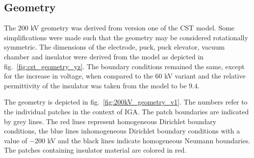 \subsection{Geometry}
The $200$ kV geometry was derived from version one of the CST model. Some simplifications were made such that the geometry may be considered rotationally symmetric. The dimensions of the electrode, puck, puck elevator, vacuum chamber and insulator were derived from the model as depicted in fig.~\ref{fig:cst_geometry_yz}. The boundary conditions remained the same, except for the increase in voltage, when compared to the $60$ kV variant and the relative permittivity of the insulator was taken from the model to be $9.4$.

The geometry is depicted in fig.~\ref{fig:200kV_geometry_v1}. The numbers refer to the individual patches in the context of IGA. The patch boundaries are indicated by grey lines. The red lines represent homogeneous Dirichlet boundary conditions, the blue lines inhomogeneous Dirichlet boundary conditions with a value of $-200$ kV and the black lines indicate homogeneous Neumann boundaries.
The patches containing insulator material are colored in red.

